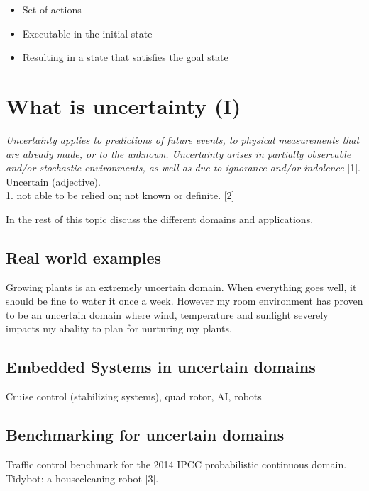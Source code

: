 \documentclass[runningheads,a4paper]{llncs}
\begin{document}
\begin{itemize}
	\item Set of actions
	\item Executable in the initial state
	\item Resulting in a state that satisfies the goal state
\end{itemize}

\section{What is uncertainty (I)}

\emph{Uncertainty applies to predictions of future events, to physical measurements that are already made, or to the unknown. Uncertainty arises in partially observable and/or stochastic environments, as well as due to ignorance and/or indolence} [1]. \\

Uncertain (adjective). \\
1. not able to be relied on; not known or definite. [2]

In the rest of this topic discuss the different domains and applications.

\subsection{Real world examples}

Growing plants is an extremely uncertain domain. When everything goes well, it should be fine to water it once a week. However my room environment has proven to be an uncertain domain where wind, temperature and sunlight severely impacts my abality to plan for nurturing my plants.

\subsection{Embedded Systems in uncertain domains}

Cruise control (stabilizing systems), quad rotor, AI, robots

\subsection{Benchmarking for uncertain domains}

Traffic control benchmark for the 2014 IPCC probabilistic continuous domain.
Tidybot: a housecleaning robot [3]. \\

\end{document}
